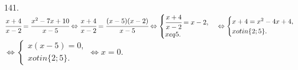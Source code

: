 141. $\cfrac{x+4}{x-2}=\cfrac{x^2-7x+10}{x-5}\Leftrightarrow
\cfrac{x+4}{x-2}=\cfrac{(x-5)(x-2)}{x-5}\Leftrightarrow
\begin{cases} \cfrac{x+4}{x-2}=x-2,\\ x
eq5.\end{cases}\Leftrightarrow
\begin{cases} x+4=x^2-4x+4,\\ x
otin\{2;5\}.\end{cases}$\\$\Leftrightarrow
\begin{cases} x(x-5)=0,\\ x
otin\{2;5\}.\end{cases}\Leftrightarrow x=0.$\\
